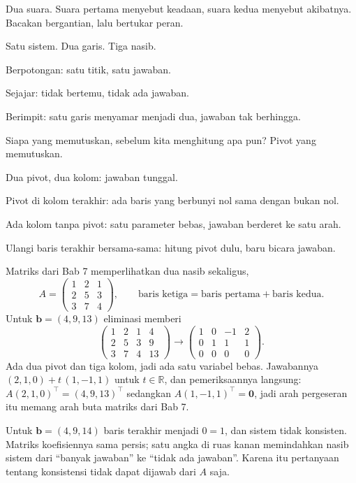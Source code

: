 \begin{bacakeras}
Dua suara. Suara pertama menyebut keadaan, suara kedua menyebut akibatnya. Bacakan
bergantian, lalu bertukar peran.

Satu sistem. Dua garis. Tiga nasib.

Berpotongan: satu titik, satu jawaban.

Sejajar: tidak bertemu, tidak ada jawaban.

Berimpit: satu garis menyamar menjadi dua, jawaban tak berhingga.

Siapa yang memutuskan, sebelum kita menghitung apa pun? Pivot yang memutuskan.

Dua pivot, dua kolom: jawaban tunggal.

Pivot di kolom terakhir: ada baris yang berbunyi nol sama dengan bukan nol.

Ada kolom tanpa pivot: satu parameter bebas, jawaban berderet ke satu arah.

Ulangi baris terakhir bersama-sama: hitung pivot dulu, baru bicara jawaban.
\end{bacakeras}

Matriks dari Bab 7 memperlihatkan dua nasib sekaligus,
\[
  A=\begin{pmatrix}1&2&1\\ 2&5&3\\ 3&7&4\end{pmatrix},
  \qquad \text{baris ketiga}=\text{baris pertama}+\text{baris kedua}.
\]
Untuk $\mathbf{b}=(4,9,13)$ eliminasi memberi
\[
  \left(\begin{array}{ccc|c}1&2&1&4\\ 2&5&3&9\\ 3&7&4&13\end{array}\right)
  \longrightarrow
  \left(\begin{array}{ccc|c}1&0&-1&2\\ 0&1&1&1\\ 0&0&0&0\end{array}\right).
\]
Ada dua pivot dan tiga kolom, jadi ada satu variabel bebas. Jawabannya
$(2,1,0)+t\,(1,-1,1)$ untuk $t\in\mathbb{R}$, dan pemeriksaannya langsung:
$A(2,1,0)^{\top}=(4,9,13)^{\top}$ sedangkan $A(1,-1,1)^{\top}=\mathbf{0}$, jadi arah
pergeseran itu memang arah buta matriks dari Bab 7.

Untuk $\mathbf{b}=(4,9,14)$ baris terakhir menjadi $0=1$, dan sistem tidak konsisten.
Matriks koefisiennya sama persis; satu angka di ruas kanan memindahkan nasib sistem dari
``banyak jawaban'' ke ``tidak ada jawaban''. Karena itu pertanyaan tentang konsistensi tidak
dapat dijawab dari $A$ saja.

